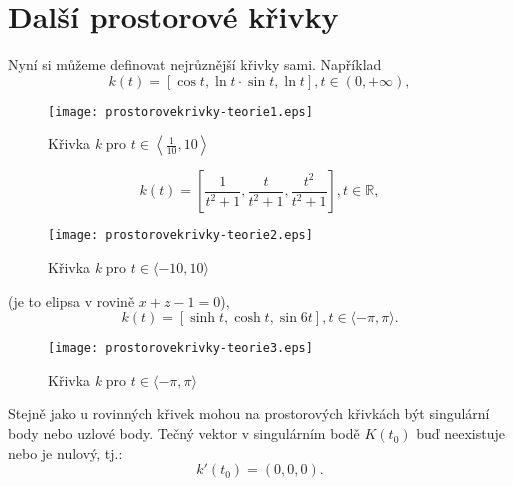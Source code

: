 \chapter{Další prostorové křivky}
Nyní si můžeme definovat nejrůznější křivky sami. Například
$$k(t)=[\cos{t}, \ln{t}\cdot\sin{t}, \ln{t}], t \in (0, +\infty),$$
\begin{figure}[H]
	\centering
	\texttt{[image: prostorovekrivky-teorie1.eps]}
	\caption{Křivka \textit{k} pro $t \in \left\langle\frac{1}{10}, 10\right\rangle$}
\end{figure}
$$k(t)=\left[\frac{1}{t^2+1}, \frac{t}{t^2+1}, \frac{t^2}{t^2+1}\right], t \in \mathbb{R},$$
\begin{figure}[H]
	\centering
	\texttt{[image: prostorovekrivky-teorie2.eps]}
	\caption{Křivka \textit{k} pro $t \in \langle-10,10\rangle$}
\end{figure}
(je to elipsa v rovině $x+z-1=0$), \clearpage{}
\noindent{}$$k(t)=[\sinh{t}, \cosh{t}, \sin{6t}], t \in \langle-\pi, \pi\rangle.$$
\begin{figure}[H]
	\centering
	\texttt{[image: prostorovekrivky-teorie3.eps]}
	\caption{Křivka \textit{k} pro $t \in \langle-\pi, \pi\rangle$}
\end{figure}
\noindent Stejně jako u rovinných křivek mohou na prostorových křivkách být singulární body nebo uzlové body. Tečný vektor v singulárním bodě $K(t_0)$ buď neexistuje nebo je nulový, tj.:
$$k'(t_0)=(0,0,0).$$
\clearpage
